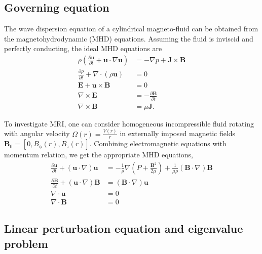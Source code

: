 \documentclass{jfm}
\newcommand{\del}{\nabla}
\begin{document}
%
%
\subsection{Governing equation}

The wave dispersion equation of a cylindrical magneto-fluid can be obtained from the magnetohydrodynamic (MHD) equations. Assuming the fluid is inviscid and perfectly conducting, the ideal MHD equations are
\begin{align}
    \rho\left(\frac{\partial\mathbf{u}}{\partial t}+\mathbf{u}\cdot\del\mathbf{u}\right) &= -\del p +\mathbf{J}\times\mathbf{B} \\
    \frac{\partial \rho}{\partial t} + \del\cdot(\rho \mathbf{u})&=0 \\
    \mathbf{E}+\mathbf{u}\times\mathbf{B}&=0 \\
    \del\times \mathbf{E} &= -\frac{\partial \mathbf{B}}{\partial t} \\
    \del \times \mathbf{B} &= \mu \mathbf{J}.
\end{align}

To investigate MRI, one can consider homogeneous incompressible fluid rotating with angular velocity $\Omega(r)=\frac{V(r)}{r}$ in externally imposed magnetic fields $\mathbf{B}_0 = [0,B_\phi(r),B_z(r)]$. Combining electromagnetic equations with momentum relation, we get the appropriate MHD equations,
\begin{align}
    \frac{\partial \mathbf{u}}{\partial t}+(\mathbf{u}\cdot\del)\mathbf{u} &= -\frac{1}{\rho}\del\left(P+\frac{\mathbf{B}^2}{2\mu}\right)+\frac{1}{\mu\rho}(\mathbf{B}\cdot\del)\mathbf{B}\\
    \frac{\partial \mathbf{B}}{\partial t} +(\mathbf{u}\cdot\del)\mathbf{B} &=(\mathbf{B}\cdot\del)\mathbf{u} \\
    \del\cdot\mathbf{u}&=0\\
    \del \cdot \mathbf{B} &=0
\end{align}


%
%
\subsection{Linear perturbation equation and eigenvalue problem}
\end{document}
